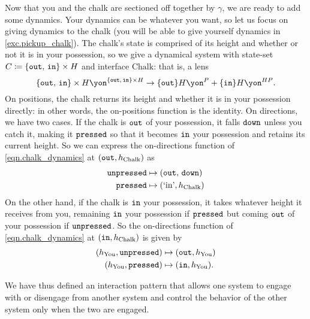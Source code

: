 \documentclass[Book-Poly]{subfiles}
\begin{document}
\begin{example}
Now that you and the chalk are sectioned off together by $\gamma$, we are ready to add some dynamics.
Your dynamics can be whatever you want, so let us focus on giving dynamics to the chalk (you will be able to give yourself dynamics in \cref{exc.pickup_chalk}).
The chalk's state is comprised of its height and whether or not it is in your possession, so we give a dynamical system with state-set $C\coloneqq\{\texttt{out},\,\texttt{in}\} \times H$ and interface $\text{Chalk}$: that is, a lens
\begin{equation}\label{eqn.chalk_dynamics}
	\{\const{out},\,\const{in}\}\times H\yon^{\{\const{out},\,\const{in}\}\times H}\to\{\const{out}\}H\yon^P + \{\const{in}\}H\yon^{HP}.
\end{equation}
On positions, the chalk returns its height and whether it is in your possession directly: in other words, the on-positions function is the identity.
On directions, we have two cases.
If the chalk is $\texttt{out}$ of your possession, it falls $\texttt{down}$ unless you catch it, making it $\texttt{pressed}$ so that it becomes $\texttt{in}$ your possession and retains its current height.
So we can express the on-directions function of \eqref{eqn.chalk_dynamics} at $(\texttt{out}, h_\text{Chalk})$ as
\begin{align*}
	\texttt{unpressed} &\mapsto (\texttt{out},\,\texttt{down}) \\
	\texttt{pressed} &\mapsto (\text{`in'}, h_\text{Chalk})
\end{align*}
On the other hand, if the chalk is $\texttt{in}$ your possession, it takes whatever height it receives from you, remaining $\texttt{in}$ your possession if $\texttt{pressed}$ but coming $\texttt{out}$ of your possession if $\texttt{unpressed}$.
So the on-directions function of \eqref{eqn.chalk_dynamics} at $(\texttt{in}, h_\text{Chalk})$ is given by
\begin{align*}
	(h_\text{You}, \texttt{unpressed}) &\mapsto (\texttt{out}, h_\text{You}) \\
	(h_\text{You}, \texttt{pressed}) &\mapsto (\texttt{in}, h_\text{You}).
\end{align*}

We have thus defined an interaction pattern that allows one system to engage with or disengage from another system and control the behavior of the other system only when the two are engaged.
\end{example}
\end{document}
